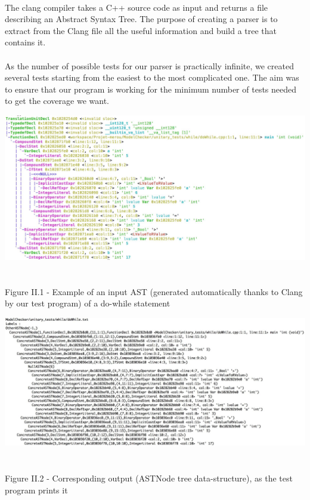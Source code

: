 \documentclass{report}
\begin{document}
\paragraph{}
\hspace{4mm}The clang compiler takes a C++ source code as input 
and returns a file describing an Abstract Syntax Tree. The purpose of creating a parser
is to extract from the Clang file all the useful information and build a tree
that contains it.

\paragraph{}
\hspace{4mm}As the number of possible tests for our parser is practically infinite, we created several tests
starting from the easiest to the most complicated one. The aim was to ensure that our
program is working for the minimum number of tests needed to get the coverage we want.

\begin{center}
\includegraphics[scale=0.3]{data/dowhile_clang.jpg}
~\\~\\Figure II.1 - Example of an input AST (generated automatically thanks to Clang by our test program) of a do-while statement
\end{center}

\begin{center}
\includegraphics[scale=0.3]{data/while_astNode.jpg}
~\\~\\Figure II.2 - Corresponding output (ASTNode tree data-structure), as the test program prints it
\end{center}
\end{document}
